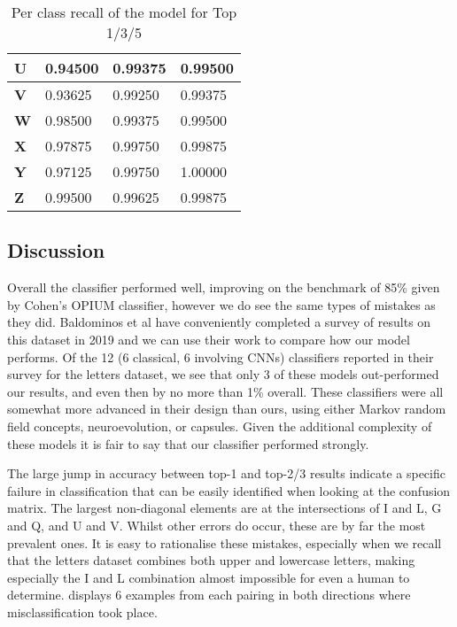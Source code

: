 \documentclass[12pt]{article}
\numberwithin{equation}{section}
\numberwithin{figure}{section}
\numberwithin{table}{section}
\begin{document}
\begin{table}[]
\begin{tabular}{|l|l|l|l|}
  \textbf{U}     & 0.94500        & 0.99375        & 0.99500        \\ \hline
  \textbf{V}     & 0.93625        & 0.99250        & 0.99375        \\ \hline
  \textbf{W}     & 0.98500        & 0.99375        & 0.99500        \\ \hline
  \textbf{X}     & 0.97875        & 0.99750        & 0.99875        \\ \hline
  \textbf{Y}     & 0.97125        & 0.99750        & 1.00000        \\ \hline
  \textbf{Z}     & 0.99500        & 0.99625        & 0.99875        \\ \hline
  \end{tabular}
  \caption{Per class recall of the model for Top 1/3/5}
  \label{tab:per_class_res}
  \end{table}
\subsection{Discussion}
Overall the classifier performed well, improving on the benchmark of 85\% given by Cohen's OPIUM classifier\cite{Cohen}, however we do see the same types of mistakes as they did. Baldominos et al \cite{Baldominos2019} have conveniently completed a survey of results on this dataset in 2019 and we can use their work to compare how our model performs. Of the 12 (6 classical, 6 involving CNNs) classifiers reported in their survey for the letters dataset, we see that only 3 of these models out-performed our results, and even then by no more than 1\% overall. These classifiers were all somewhat more advanced in their design than ours, using either Markov random field concepts, neuroevolution, or capsules. Given the additional complexity of these models it is fair to say that our classifier performed strongly.

The large jump in accuracy between top-1 and top-2/3 results indicate a specific failure in classification that can be easily identified when looking at the confusion matrix. The largest non-diagonal elements are at the intersections of I and L, G and Q, and U and V. Whilst other errors do occur, these are by far the most prevalent ones. It is easy to rationalise these mistakes, especially when we recall that the letters dataset combines both upper and lowercase letters, making especially the I and L combination almost impossible for even a human to determine.  displays 6 examples from each pairing in both directions where misclassification took place.
\end{document}
